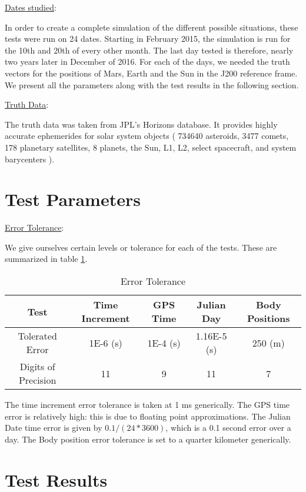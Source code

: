 \underline{Dates studied}:

In order to create a complete simulation of the different possible situations, these tests were run on 24 dates. Starting in February 2015, the simulation is run for the 10th and 20th of every other month. The last day tested is therefore, nearly two years later in December of 2016. For each of the days, we needed the truth vectors for the positions of Mars, Earth and the Sun in the J200 reference frame. We present all the parameters along with the test results in the following section.

\underline{Truth Data}:

The truth data was taken from JPL's Horizons database. It provides highly accurate ephemerides for solar system objects ( 734640 asteroids, 3477 comets, 178 planetary satellites, 8 planets, the Sun, L1, L2, select spacecraft, and system barycenters ). 


\section{Test Parameters}

\underline{Error Tolerance}:

We give ourselves certain levels or tolerance for each of the tests. These are summarized in table \ref{tab:errortol}. 

\begin{table}[htbp]
	\caption{Error Tolerance}
	\label{tab:errortol}
	\centering \fontsize{10}{10}\selectfont
	\begin{tabular}{| c | c | c | c | c |} %
		\hline
		Test   & Time Increment &GPS Time& Julian Day & Body Positions \\
		\hline
		Tolerated Error & 1E-6 (s) & 1E-4 (s) & 1.16E-5 (s) & 250 (m) \\
		\hline
		Digits of Precision & 11 & 9 & 11 & 7 \\
		\hline
	\end{tabular}
\end{table}

The time increment error tolerance is taken at 1 ms generically. The GPS time error is relatively high: this is due to floating point approximations. The Julian Date time error is given by $0.1/(24*3600)$, which is a 0.1 second error over a day.  The Body position error tolerance is set to a quarter kilometer generically. 

\section{Test Results}
